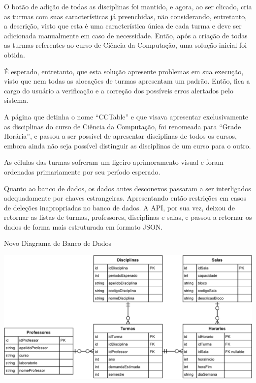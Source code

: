 
O botão de adição de todas as disciplinas foi mantido, e agora, ao ser clicado, cria as turmas com suas características já preenchidas, não considerando, entretanto, a descrição, visto que esta é uma característica única de cada turma e deve ser adicionada manualmente em caso de necessidade. Então, após a criação de todas as turmas referentes ao curso de Ciência da Computação, uma solução inicial foi obtida.

É esperado, entretanto, que esta solução apresente problemas em sua execução, visto que nem todas as alocações de turmas apresentam um padrão. Então, fica a cargo do usuário a verificação e a correção dos possíveis erros alertados pelo sistema.

 \label{Grade Horária}

A página que detinha o nome ``CCTable'' e que visava apresentar exclusivamente as disciplinas do curso de Ciência da Computação, foi renomeada para ``Grade Horária'', e passou a ser possível de apresentar disciplinas de todos os cursos, embora ainda não seja possível distinguir as disciplinas de um curso para o outro.

As células das turmas sofreram um ligeiro aprimoramento visual e foram ordenadas primariamente por seu período esperado.

 \label{Banco de dados}

Quanto ao banco de dados, os dados antes desconexos passaram a ser interligados adequadamente por chaves estrangeiras. Apresentando então restrições em casos de deleções inapropriadas no banco de dados. A API, por sua vez, deixou de retornar as listas de turmas, professores, disciplinas e salas, e passou a retornar os dados de forma mais estruturada em formato JSON.

\begin{MyCenteredFigure}
  \caption{Novo Diagrama de Banco de Dados}
  \label{fig:MVP3_BancoDeDados}
  \includegraphics[width=\textwidth]{files/img/2.02!5-desenvolvimento/2.02!5.1.4-sistema/Diagrama_ER-How_it_should_be.drawio}
\end{MyCenteredFigure}

